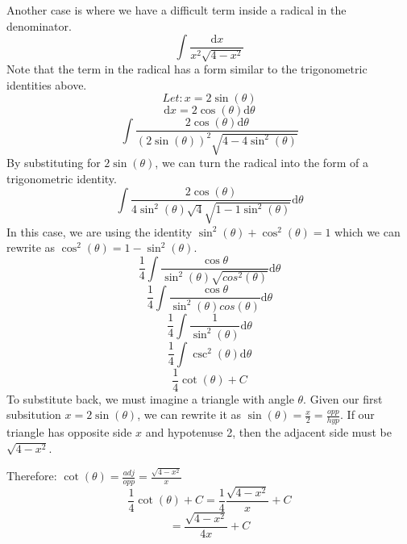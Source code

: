\documentclass[letterpaper, 12pt]{article}
\newcommand*{\diff}{\mathrm{d}}
\begin{document}
Another case is where we have a difficult term inside a radical in the
denominator.
\[ \int{\frac{\diff{x}}{x^{2}\sqrt{4-x^{2}}}} \]
Note that the term in the radical has a form similar to the trigonometric
identities above.
\[ Let: x = 2\sin(\theta) \]
\[ \diff{x} = 2\cos(\theta)\diff{\theta} \]
\[ \int{\frac{2\cos(\theta)\diff{\theta}}
   {(2\sin(\theta))^{2}\sqrt{4-4\sin^{2}(\theta)}}} \]
By substituting for \( 2\sin(\theta) \), we can turn the radical into the form
of a trigonometric identity.
\[ \int{\frac{2\cos(\theta)}
  {4\sin^{2}(\theta)\sqrt{4}\sqrt{1-1\sin^{2}(\theta)}}\diff{\theta}} \]
In this case, we are using the identity
\( \sin^{2}(\theta)+\cos^{2}(\theta) = 1 \) which we can rewrite as
\( \cos^{2}(\theta) = 1-\sin^{2}(\theta) \).
\[ \frac{1}{4}\int{\frac{\cos{\theta}}
   {\sin^{2}(\theta)\sqrt{cos^{2}(\theta)}}\diff{\theta}} \]
\[ \frac{1}{4}\int{\frac{\cos{\theta}}
    {\sin^{2}(\theta)cos(\theta)}\diff{\theta}} \]
\[ \frac{1}{4}\int{\frac{1}{\sin^{2}(\theta)}\diff{\theta}} \]
\[ \frac{1}{4}\int{\csc^{2}(\theta)\diff{\theta}} \]
\[ \frac{1}{4}\cot(\theta)+C \]
To substitute back, we must imagine a triangle with angle \( \theta \). Given
our first subsitution \( x = 2\sin(\theta) \), we can rewrite it as
\( \sin(\theta) = \frac{x}{2} = \frac{opp}{hyp} \). If our triangle has opposite
side \( x \) and hypotenuse 2, then the adjacent side must be
\( \sqrt{4-x^{2}} \).
\begin{center}
\end{center}
Therefore: \( \cot(\theta) = \frac{adj}{opp} = \frac{\sqrt{4-x^{2}}}{x} \)
\[ \frac{1}{4}\cot(\theta)+C = \frac{1}{4}\frac{\sqrt{4-x^{2}}}{x}+C \]
\[ = \frac{\sqrt{4-x^{2}}}{4x}+C \]
\end{document}

